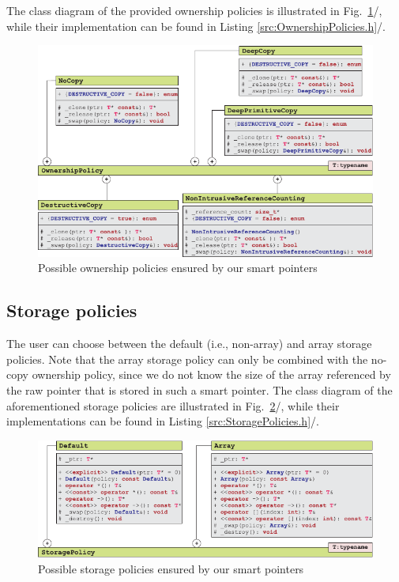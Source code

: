 \documentclass[b5paper, twosided]{book}
\DeclareRobustCommand{\mref}[1]{\ref{#1}{\relsize{-1}/\pageref{#1}}}
\begin{document}
The class diagram of the provided ownership policies is illustrated in Fig.\ \mref{fig:UMLOwnershipPolicy}, while their implementation can be found in Listing \mref{src:OwnershipPolicies.h}. 

\begin{figure}[!h]
	\centering
	\includegraphics[]{images/UMLOwnershipPolicy.pdf}
	\caption{Possible ownership policies ensured by our smart pointers}
	\label{fig:UMLOwnershipPolicy}
\end{figure}

\newpage{}


\subsection{Storage policies}

The user can choose between the default (i.e., non-array) and array storage policies. Note that the array storage policy can only be combined with the no-copy ownership policy, since we do not know the size of the array referenced by the raw pointer that is stored in such a smart pointer. The class diagram of the aforementioned storage policies are illustrated in Fig.\ \mref{fig:UMLStoragePolicy}, while their implementations can be found in Listing \mref{src:StoragePolicies.h}. 

\begin{figure}[!h]
	\centering
	\includegraphics[]{images/UMLStoragePolicy.pdf}
	\caption{Possible storage policies ensured by our smart pointers}
	\label{fig:UMLStoragePolicy}
\end{figure}
\end{document}
